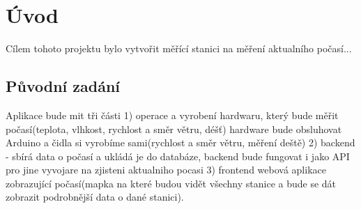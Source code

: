 \section{Úvod}
Cílem tohoto projektu bylo vytvořit měřící stanici na měření aktualního počasí...

\subsection{Původní zadání}
Aplikace bude mit tři části 1) operace a vyrobení hardwaru, který bude měřit počasí(teplota, vlhkost, rychlost a směr větru, déšť) hardware bude obsluhovat Arduino a čidla si vyrobíme sami(rychlost a směr větru, měření deště) 2) backend - sbírá data o počasí a ukládá je do databáze, backend bude fungovat i jako API pro jine vyvojare na zjisteni aktualniho pocasi 3) frontend webová aplikace zobrazující počasí(mapka na které budou vidět všechny stanice a bude se dát zobrazit podrobnější data o dané stanici).
